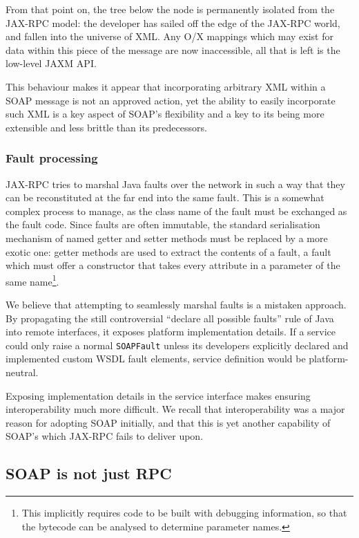From that point on, the tree below the node is permanently isolated
from the JAX-RPC model: the developer has sailed off the edge of the
JAX-RPC world, and fallen into the universe of XML. Any O/X mappings
which may exist for data within this piece of the message are now
inaccessible, all that is left is the low-level JAXM API. 

This behaviour makes it appear that incorporating arbitrary XML within
a SOAP message is not an approved action, yet the ability to easily
incorporate such XML is a key aspect of SOAP's flexibility and a key
to its being more extensible and less brittle than its predecessors.

\subsubsection{Fault processing}
\label{objections:soap-not-rmi:faults}

JAX-RPC tries to marshal Java faults over the network in such a way
that they can be reconstituted at the far end into the same fault.
This is a somewhat complex process to manage, as the class name of the
fault must be exchanged as the fault code. Since faults are often
immutable, the standard serialisation mechanism of named getter and
setter methods must be replaced by a more exotic one: getter methods
are used to extract the contents of a fault, a fault which must offer
a constructor that takes every attribute in a parameter of the same
name\footnote{This implicitly requires code to be built with debugging
information, so that the bytecode can be analysed to determine
parameter names.}.

We believe that attempting to seamlessly marshal faults is a mistaken
approach.  By propagating the still controversial ``declare all
possible faults'' rule of Java into remote interfaces, it exposes
platform implementation details. If a service could only raise a
normal {\tt SOAPFault} unless its developers explicitly declared and
implemented custom WSDL fault elements, service definition would be
platform-neutral.


Exposing implementation details in the service interface makes ensuring
interoperability much more difficult. We recall that interoperability
was a major reason for adopting SOAP initially, and that this is yet
another capability of SOAP's which JAX-RPC fails to deliver upon.

\subsection{SOAP is not just RPC}
\label{objections:soap-not-just-rmi}

